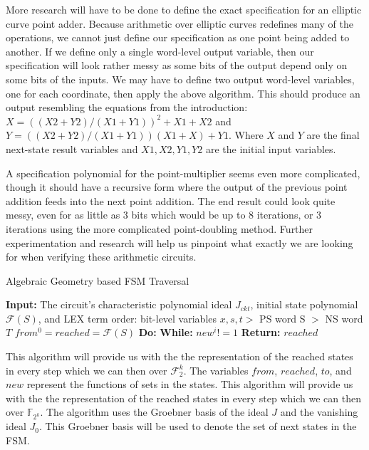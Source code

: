 \documentclass[12pt]{report}
\begin{document}
More research will have to be done to define the exact specification for an elliptic curve point adder. Because arithmetic over elliptic curves redefines many of the operations, we cannot just define our specification as one point being added to another. If we define only a single word-level output variable, then our specification will look rather messy as some bits of the output depend only on some bits of the inputs. We may have to define two output word-level variables, one for each coordinate, then apply the above algorithm. This should produce an output resembling the equations from the introduction: $X = ((X2 + Y2)/(X1+Y1))^2 + X1 + X2$ and $Y = ((X2 + Y2)/(X1 + Y1))(X1 + X) + Y1$. Where $X$ and $Y$ are the final next-state result variables and $X1, X2, Y1, Y2$ are the initial input variables. 

A specification polynomial for the point-multiplier seems even more complicated, though it should have a recursive form where the output of the previous point addition feeds into the next point addition. The end result could look quite messy, even for as little as 3 bits which would be up to 8 iterations, or 3 iterations using the more complicated point-doubling method. Further experimentation and research will help us pinpoint what exactly we are looking for when verifying these arithmetic circuits.

\iffalse %
\begin{algorithm}
\caption{Algebraic Geometry based FSM Traversal}
{\textbf{Input:} The circuit's characteristic polynomial ideal $J_{ckt}$, initial state polynomial $\mathcal{F}(S)$, and LEX term order: bit-level variables $x,s,t >$ PS word S $>$ NS word $T$}
{$from^0=reached=\mathcal{F}(S)$}
{\textbf{Do:}}
\hspace*{6mm}{$i \leftarrow i + 1 $}
\hspace*{6mm}{$reached \leftarrow reached*new^i$}
\hspace*{6mm}{$from^i \leftarrow new^i(S$/$T)$}
{\textbf{While:} $new^i != 1$}
{\textbf{Return:} $reached$}

\end{algorithm}

This algorithm will provide us with the the representation of the reached states in every step which we can then over $\mathcal{F}_2^k$. The variables $from$, $reached$, $to$, and $new$ represent the functions of sets in the states.
This algorithm will provide us with the the representation of the reached states in every step which we can then over $\mathbb{F}_{2^k}$. The algorithm uses the Groebner basis of the ideal $J$ and the vanishing ideal $J_0$. This Groebner basis will be used to denote the set of next states in the FSM. 
\end{document}
